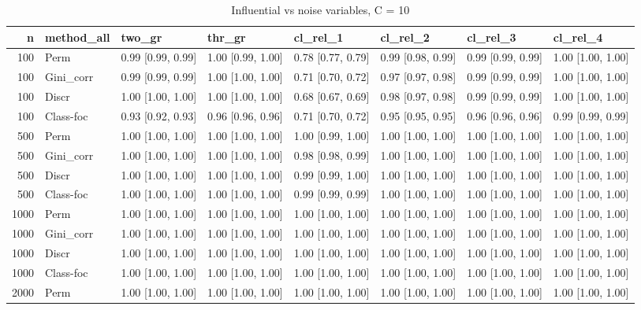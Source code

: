 \begin{table}[ht]
\centering
\caption{Influential vs noise variables, C = 10} 
\begin{tabular}{rlllllll}
  \hline
n & method\_all & two\_gr & thr\_gr & cl\_rel\_1 & cl\_rel\_2 & cl\_rel\_3 & cl\_rel\_4 \\ 
  \hline
100 & Perm & 0.99 [0.99, 0.99] & 1.00 [0.99, 1.00] & 0.78 [0.77, 0.79] & 0.99 [0.98, 0.99] & 0.99 [0.99, 0.99] & 1.00 [1.00, 1.00] \\ 
  100 & Gini\_corr & 0.99 [0.99, 0.99] & 1.00 [1.00, 1.00] & 0.71 [0.70, 0.72] & 0.97 [0.97, 0.98] & 0.99 [0.99, 0.99] & 1.00 [1.00, 1.00] \\ 
  100 & Discr & 1.00 [1.00, 1.00] & 1.00 [1.00, 1.00] & 0.68 [0.67, 0.69] & 0.98 [0.97, 0.98] & 0.99 [0.99, 0.99] & 1.00 [1.00, 1.00] \\ 
  100 & Class-foc & 0.93 [0.92, 0.93] & 0.96 [0.96, 0.96] & 0.71 [0.70, 0.72] & 0.95 [0.95, 0.95] & 0.96 [0.96, 0.96] & 0.99 [0.99, 0.99] \\ 
   \hline 500 & Perm & 1.00 [1.00, 1.00] & 1.00 [1.00, 1.00] & 1.00 [0.99, 1.00] & 1.00 [1.00, 1.00] & 1.00 [1.00, 1.00] & 1.00 [1.00, 1.00] \\ 
  500 & Gini\_corr & 1.00 [1.00, 1.00] & 1.00 [1.00, 1.00] & 0.98 [0.98, 0.99] & 1.00 [1.00, 1.00] & 1.00 [1.00, 1.00] & 1.00 [1.00, 1.00] \\ 
  500 & Discr & 1.00 [1.00, 1.00] & 1.00 [1.00, 1.00] & 0.99 [0.99, 1.00] & 1.00 [1.00, 1.00] & 1.00 [1.00, 1.00] & 1.00 [1.00, 1.00] \\ 
  500 & Class-foc & 1.00 [1.00, 1.00] & 1.00 [1.00, 1.00] & 0.99 [0.99, 0.99] & 1.00 [1.00, 1.00] & 1.00 [1.00, 1.00] & 1.00 [1.00, 1.00] \\ 
   \hline 1000 & Perm & 1.00 [1.00, 1.00] & 1.00 [1.00, 1.00] & 1.00 [1.00, 1.00] & 1.00 [1.00, 1.00] & 1.00 [1.00, 1.00] & 1.00 [1.00, 1.00] \\ 
  1000 & Gini\_corr & 1.00 [1.00, 1.00] & 1.00 [1.00, 1.00] & 1.00 [1.00, 1.00] & 1.00 [1.00, 1.00] & 1.00 [1.00, 1.00] & 1.00 [1.00, 1.00] \\ 
  1000 & Discr & 1.00 [1.00, 1.00] & 1.00 [1.00, 1.00] & 1.00 [1.00, 1.00] & 1.00 [1.00, 1.00] & 1.00 [1.00, 1.00] & 1.00 [1.00, 1.00] \\ 
  1000 & Class-foc & 1.00 [1.00, 1.00] & 1.00 [1.00, 1.00] & 1.00 [1.00, 1.00] & 1.00 [1.00, 1.00] & 1.00 [1.00, 1.00] & 1.00 [1.00, 1.00] \\ 
   \hline 2000 & Perm & 1.00 [1.00, 1.00] & 1.00 [1.00, 1.00] & 1.00 [1.00, 1.00] & 1.00 [1.00, 1.00] & 1.00 [1.00, 1.00] & 1.00 [1.00, 1.00] \\ 

\end{tabular}
\end{table}
